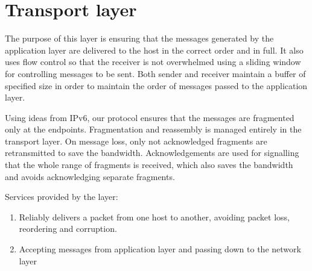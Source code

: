 \documentclass[11pt,a4paper,oneside]{report}
\begin{document}
\section*{Transport layer} 
The purpose of this layer is ensuring that the messages generated by the
application layer are delivered to the host in the correct order and in full.
It also uses flow control so that the receiver is not overwhelmed using a
sliding window for controlling messages to be sent. Both sender and receiver 
maintain a buffer of specified size in order to maintain the order of messages 
passed to the application layer.

Using ideas from IPv6, our protocol ensures that the messages are fragmented
only at the endpoints. Fragmentation and reassembly is managed entirely in the
transport layer. On message loss, only not acknowledged fragments are
retransmitted to save the bandwidth. Acknowledgements are used for signalling
that the whole range of fragments is received, which also saves the bandwidth
and avoids acknowledging separate fragments.
    
Services provided by the layer:
\begin{enumerate}
  \item Reliably delivers a packet from one host to another, avoiding
   packet loss, reordering and corruption.
   \item Accepting messages from application layer and passing down to the
   network layer
\end{enumerate}
\end{document}
